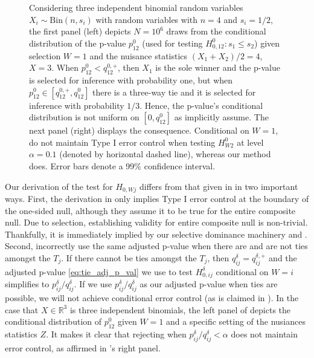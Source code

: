 \documentclass{article}
\newcommand{\R}{\mathbb{R}}
\begin{document}
\begin{figure}[]
    \caption{Considering three independent binomial random variables $X_i \sim \text{Bin}(n, s_i)$ with random variables with $n=4$ and $s_i = 1/2$, the first panel (left) depicts $N=10^6$ draws from the conditional distribution of the p-value $p^{0}_{12}$ (used for testing $H^{0}_{0, 12}: s_1 \leq s_2$) given selection $W= 1$ and the nuisance statistics $(X_1 + X_2)/2 = 4$, $X=3$. When $p_{12}^0  < q^{0, +}_{12}$, then $X_1$ is the sole winner and the p-value is selected for inference with probability one, but when $p_{12}^0 \in [q^{0, +}_{12}, q^0_{12}]$ there is a three-way tie and it is selected for inference with probability $1/3$. Hence, the p-value's conditional distribution is not uniform on $[0, q^0_{12}]$ as \cite{Hung2019} implicitly assume. The next panel (right) displays the consequence. Conditional on $W=1$, \cite{Hung2019} do not maintain Type I error control when testing $H^{0}_{W2}$ at level $\alpha=0.1$ (denoted by horizontal dashed line), whereas our method does. Error bars denote a 99\% confidence interval.}
    \label{fig:error_control}
\end{figure}

Our derivation of the test for $H_{0, Wj}$ differs from that given in \cite{Hung2019} in two important ways. First, the derivation in \cite{Hung2019} only implies Type I error control at the boundary of the one-sided null, although they assume it to be true for the entire composite null. Due to selection, establishing validity for entire composite null is non-trivial. Thankfully, it is immediately implied by our selective dominance machinery and . Second, \cite{Hung2019} incorrectly use the same adjusted p-value when there are and are not ties amongst the $T_j$. If there cannot be ties amongst the $T_j$, then $q^{\delta}_{ij} = q^{\delta, +}_{ij}$ and the adjusted p-value \eqref{eq:tie_adj_p_val} we use to test $H^{\delta}_{0, ij}$ conditional on $W = i$ simplifies to $p^{\delta}_{ij}/q^{\delta}_{ij}$. If we use $p^{\delta}_{ij}/q^{\delta}_{ij}$ as our adjusted p-value when ties are possible, we will not achieve conditional error control (as is claimed in \cite{Fithian}). In the case that $X \in \R^3$ is three independent binomials, the left panel of  depicts the conditional distribution of $p^{0}_{12}$ given $W=1$ and a specific setting of the nusiances statistics $Z$. It makes it clear that rejecting when $p^{\delta}_{ij}/q^{\delta}_{ij} < \alpha $ does not maintain error control, as affirmed in 's right panel. 
\end{document}
